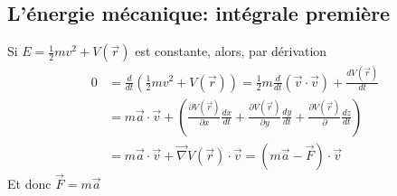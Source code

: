 \documentclass[../main.tex]{subfiles}
\begin{document}
\subsection{L'énergie mécanique: intégrale première}
Si $E= \frac{1}{2}mv^{2} + V( \vec{r}) $ est constante, alors, par dérivation
\begin{align*}
	0 &= \frac{d}{dt} ( \frac{1}{2}m v^{2} + V( \vec{r}) ) = \frac{1}{2}m \frac{d}{dt} ( \vec{v}\cdot \vec{v}) + \frac{d V( \vec{r}) }{dt}\\
	  &= m \vec{a} \cdot \vec{v} + \left( \frac{\partial V ( \vec{r}) }{\partial x} \frac{dx}{dt} + \frac{\partial V( \vec{r}) }{\partial y} \frac{dy}{dt} + \frac{\partial V( \vec{r}) }{\partial }\frac{dz}{dt} \right) \\
	  &= m \vec{a} \cdot \vec{v} + \vec{\nabla} V( \vec{r}) \cdot \vec{v} = ( m \vec{a} - \vec{F}) \cdot \vec{v}
\end{align*}
Et donc $\vec{F} = m \vec{a}$




	
\end{document}
